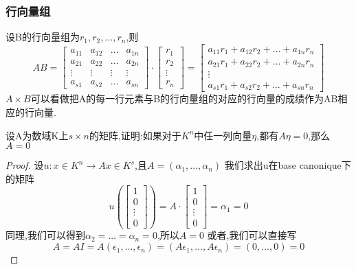 \documentclass{article}
\begin{document}
\subsubsection{行向量组}
设B的行向量组为$r_1,r_2,\ldots,r_n$,则
$$
AB=
\begin{bmatrix}
  a_{11} & a_{12} & \dots & a_{1n}  \\
  a_{21} & a_{22} & \dots & a_{2n}  \\
  \vdots & \vdots & \vdots &\vdots \\
  a_{s1} & a_{s2} & \dots & a_{sn}
\end{bmatrix}
\cdot
\begin{bmatrix}
  r_1 \\
  r_2 \\
  \vdots \\
  r_n
\end{bmatrix}
=
\begin{bmatrix}
  a_{11}r_1 + a_{12}r_2 + \dots + a_{1n}r_n  \\
  a_{21}r_1 + a_{22}r_2 + \dots + a_{2n}r_n   \\
  \vdots \\
  a_{s1}r_1 + a_{s2}r_2 + \dots + a_{sn}r_n
\end{bmatrix}
$$
$A\times B$可以看做把A的每一行元素与B的行向量组的对应的行向量的成绩作为AB相应的行向量.

\begin{question}
  设A为数域K上$s \times n$的矩阵,证明:如果对于$K^n$中任一列向量$\eta$,都有$A\eta=0$,那么$A=0$
\end{question}
\begin{proof}
  设$u:x \in K^n \rightarrow Ax \in K^s$,且$A=(\alpha_1,\ldots,\alpha_n)$ \newline
  我们求出u在base canonique下的矩阵 \newline
  $$
  u(\begin{bmatrix}
    1 \\
    0\\
    \vdots \\
    0
  \end{bmatrix})
  =A \cdot
  \begin{bmatrix}
    1 \\
    0\\
    \vdots \\
    0
  \end{bmatrix}
  =\alpha_1=0
  $$
  同理,我们可以得到$\alpha_2=\dots=\alpha_n=0$,所以$A=0$ \newline
  或者,我们可以直接写
  $$
  A=AI=A(\epsilon_1,\ldots,\epsilon_n)=(A\epsilon_1,\dots,A\epsilon_n)=(0,\ldots,0)=0
  $$
\end{proof}
\end{document}

